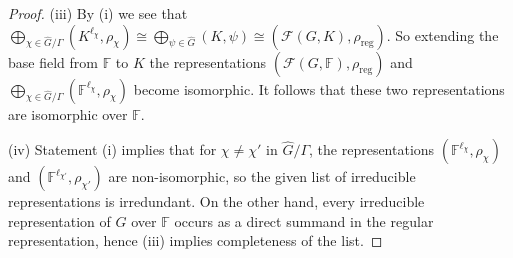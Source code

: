 \documentclass[10pt,a4paper]{amsart}
\def\FF{\mathbb{F}}
\def\field{K}
\begin{document}
\begin{proof}
(iii)  By (i) we see that 
$\bigoplus_{\chi\in \widehat G/\Gamma}(\field^{\ell_\chi},\rho_\chi)
\cong \bigoplus_{\psi\in \widehat G}(\field,\psi)\cong (\mathcal{F}(G,\field),\rho_{\mathrm{reg}})$. 
So extending the base field from $\FF$ to $\field$ the representations 
$(\mathcal{F}(G,\FF),\rho_{\mathrm{reg}})$ and $\bigoplus_{\chi\in \widehat G/\Gamma}(\FF^{\ell_\chi},\rho_\chi)$ become isomorphic. 
It follows that these two representations are isomorphic over $\FF$. 

(iv) Statement (i) implies that for $\chi\neq \chi'$ in $\widehat G/\Gamma$, the representations 
$(\FF^{\ell_\chi},\rho_\chi)$ and $(\FF^{\ell_{\chi'}},\rho_{\chi'})$ are non-isomorphic, so the given list of irreducible representations is irredundant. 
On the other hand, 
every irreducible representation of $G$ over $\FF$ occurs as a direct summand 
in the regular representation, hence (iii) implies completeness of the list. 
 \end{proof} 
\end{document}
